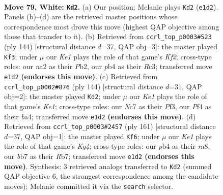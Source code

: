 \documentclass[11pt]{article}
\begin{document}
\clearpage

\begin{figure}[p]\centering
\begin{subfigure}{0.46\textwidth}\centering
\resizebox{\linewidth}{!}{%
\newchessgame
\chessboard[
  setfen={8/PbNR4/6k1/8/1p3P2/6PB/n6P/4K3 w - - 26 79},
  showmover=false,
  pgfstyle=straightmove, color=movearrow, markmove={e1-d2}
]}
\caption{}
\end{subfigure}\hfill
\begin{subfigure}{0.46\textwidth}\centering
\resizebox{\linewidth}{!}{%
\newchessgame
\chessboard[
  setfen={3k4/5pn1/4b1p1/4P3/5P1P/2R5/1P3K2/8 w - - 27 73},
  showmover=false,
  pgfstyle=straightmove, color=movearrow, markmove={f2-f3}
]}
\caption{}
\end{subfigure}
\\[4pt]
\begin{subfigure}{0.46\textwidth}\centering
\resizebox{\linewidth}{!}{%
\newchessgame
\chessboard[
  setfen={8/1p3k2/5p2/6p1/bB2P1P1/5P2/1P6/4K3 w - - 8 73},
  showmover=false,
  pgfstyle=straightmove, color=movearrow, markmove={e1-d2}
]}
\caption{}
\end{subfigure}\hfill
\begin{subfigure}{0.46\textwidth}\centering
\resizebox{\linewidth}{!}{%
\newchessgame
\chessboard[
  setfen={R7/1r4b1/3pP3/3P2k1/1p6/1Pp1K3/2B5/8 b - - 33 81},
  showmover=false,
  pgfstyle=straightmove, color=movearrow, markmove={g5-f6}
]}
\caption{}
\end{subfigure}
\caption{\textbf{Move 79, White: \texttt{Kd2}.} (a) Our position; Melanie plays \texttt{Kd2} (\texttt{e1d2}). Panels (b)--(d) are the retrieved master positions whose correspondence most drove this move (highest QAP objective among those that transfer to it). (b) Retrieved from \texttt{ccrl\_top\_p0003\#523} (ply 144) [structural distance $d$=37, QAP obj=3]: the master played \texttt{Kf3}; under $\mu$ our \emph{Ke1} plays the role of that game's \emph{Kf2}; cross-type roles: our \emph{n}a2 as their \emph{P}b2, our \emph{p}b4 as their \emph{R}c3; transferred move \texttt{e1d2} \textbf{(endorses this move)}. (c) Retrieved from \texttt{ccrl\_top\_p0002\#876} (ply 144) [structural distance $d$=31, QAP obj=2]: the master played \texttt{Kd2}; under $\mu$ our \emph{Ke1} plays the role of that game's \emph{Ke1}; cross-type roles: our \emph{N}c7 as their \emph{P}f3, our \emph{P}f4 as their \emph{b}a4; transferred move \texttt{e1d2} \textbf{(endorses this move)}. (d) Retrieved from \texttt{ccrl\_top\_p0003\#2457} (ply 161) [structural distance $d$=37, QAP obj=1]: the master played \texttt{Kf6}; under $\mu$ our \emph{Ke1} plays the role of that game's \emph{Kg4}; cross-type roles: our \emph{p}b4 as their \emph{r}a8, our \emph{b}b7 as their \emph{R}b7; transferred move \texttt{e1d2} \textbf{(endorses this move)}. Synthesis: 3 retrieved analogs transferred to \texttt{Kd2} (summed QAP objective 6, the strongest correspondence among the candidate moves); Melanie committed it via the \texttt{search} selector.}
\label{fig:thought-m156}
\end{figure}
\end{document}
